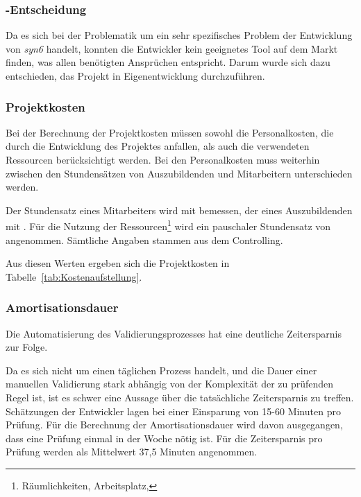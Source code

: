 \subsubsection{-Entscheidung}
\label{sec:MakeOrBuyEntscheidung}

Da es sich bei der Problematik um ein sehr spezifisches Problem der Entwicklung von \textit{syn6} handelt, konnten die Entwickler kein geeignetes Tool auf dem Markt finden, was allen benötigten Ansprüchen entspricht. Darum wurde sich dazu entschieden, das Projekt in Eigenentwicklung durchzuführen.


\subsubsection{Projektkosten}
\label{sec:Projektkosten}

Bei der Berechnung der Projektkosten müssen sowohl die Personalkosten, die durch die Entwicklung des Projektes anfallen, als auch die verwendeten Ressourcen berücksichtigt werden. Bei den Personalkosten muss weiterhin zwischen den Stundensätzen von Auszubildenden und Mitarbeitern unterschieden werden.

Der Stundensatz eines Mitarbeiters wird mit  bemessen, der eines Auszubildenden mit . Für die Nutzung der Ressourcen\footnote{Räumlichkeiten, Arbeitsplatz, \etc} wird ein pauschaler Stundensatz von  angenommen. Sämtliche Angaben stammen aus dem Controlling.

Aus diesen Werten ergeben sich die Projektkosten in Tabelle~\ref{tab:Kostenaufstellung}.



\subsubsection{Amortisationsdauer}
\label{sec:Amortisationsdauer}

Die Automatisierung des Validierungsprozesses hat eine deutliche Zeitersparnis zur Folge. 

Da es sich nicht um einen täglichen Prozess handelt, und die Dauer einer manuellen Validierung stark abhängig von der Komplexität der zu prüfenden Regel ist, ist es schwer eine Aussage über die tatsächliche Zeitersparnis zu treffen. Schätzungen der Entwickler lagen bei einer Einsparung von 15-60 Minuten pro Prüfung. Für die Berechnung der Amortisationsdauer wird davon ausgegangen, dass eine Prüfung einmal in der Woche nötig ist. Für die Zeitersparnis pro Prüfung werden als Mittelwert 37,5 Minuten angenommen. 

